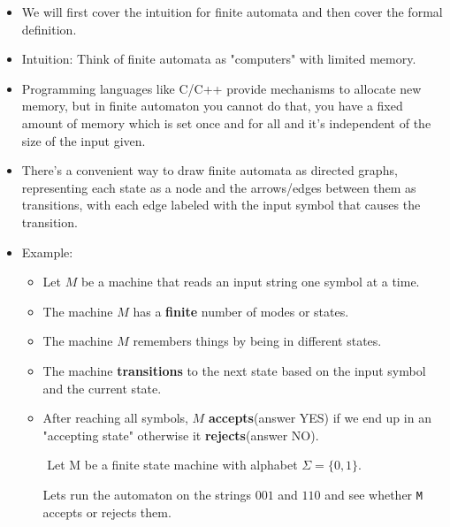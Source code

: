 \documentclass{article}
\begin{document}
\begin{itemize}
    \item We will first cover the intuition for finite automata and then cover the formal definition.
    \item Intuition: Think of finite automata as "computers" with limited memory.
    \item Programming languages like C/C++ provide mechanisms to allocate new memory, but in finite automaton you cannot do that, you have a fixed amount of memory which is set once and for all and it's independent of the size of the input given.
    \item There's a convenient way to draw finite automata as directed graphs, representing each state as a node and the arrows/edges between them as transitions, with each edge labeled with the input symbol that causes the transition.
    \item Example:
    \begin{itemize}
    \item Let $M$ be a machine that reads an input string one symbol at a time.
    \item The machine $M$ has a \textbf{finite} number of modes or states.
    \item The machine $M$ remembers things by being in different states.
    \item The machine \textbf{transitions} to the next state based on the input symbol and the current state.
    \item After reaching all symbols, $M$ \textbf{accepts}(answer YES) if we end up in an "accepting state" otherwise it \textbf{rejects}(answer NO).
    \item[$ $] Let M be a finite state machine with alphabet $\Sigma=\{0,1\}$.
    \begin{center}
    \end{center}
    Lets run the automaton on the strings $001$ and $110$ and see whether \lstinline{M} accepts or rejects them.
    \begin{table}[H]
        \begin{center}


\end{center}
\end{table}
\end{itemize}
\end{itemize}
\end{document}
